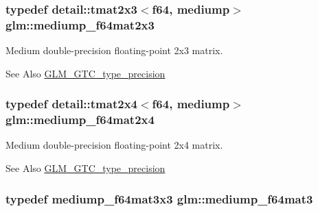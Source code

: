 \hypertarget{group__gtc__type__precision_ga6f463cb5e9b4e5c07a385843ed50e6b8}{
\subsubsection[{mediump\-\_\-f64mat2x3}]{\setlength{\rightskip}{0pt plus 5cm}typedef detail\-::tmat2x3$<$f64, mediump$>$ {\bf glm\-::mediump\-\_\-f64mat2x3}}}\label{group__gtc__type__precision_ga6f463cb5e9b4e5c07a385843ed50e6b8}
Medium double-\/precision floating-\/point 2x3 matrix. \begin{DoxySeeAlso}{See Also}
\hyperlink{group__gtc__type__precision}{G\-L\-M\-\_\-\-G\-T\-C\-\_\-type\-\_\-precision} 
\end{DoxySeeAlso}
\hypertarget{group__gtc__type__precision_ga65c67789f7e2ff605d8f48dc3750a515}{
\subsubsection[{mediump\-\_\-f64mat2x4}]{\setlength{\rightskip}{0pt plus 5cm}typedef detail\-::tmat2x4$<$f64, mediump$>$ {\bf glm\-::mediump\-\_\-f64mat2x4}}}\label{group__gtc__type__precision_ga65c67789f7e2ff605d8f48dc3750a515}
Medium double-\/precision floating-\/point 2x4 matrix. \begin{DoxySeeAlso}{See Also}
\hyperlink{group__gtc__type__precision}{G\-L\-M\-\_\-\-G\-T\-C\-\_\-type\-\_\-precision} 
\end{DoxySeeAlso}
\hypertarget{group__gtc__type__precision_gae38a4a0b57e25d9cbb153dcaab9432ec}{
\subsubsection[{mediump\-\_\-f64mat3}]{\setlength{\rightskip}{0pt plus 5cm}typedef mediump\-\_\-f64mat3x3 {\bf glm\-::mediump\-\_\-f64mat3}}}\label{group__gtc__type__precision_gae38a4a0b57e25d9cbb153dcaab9432ec}
